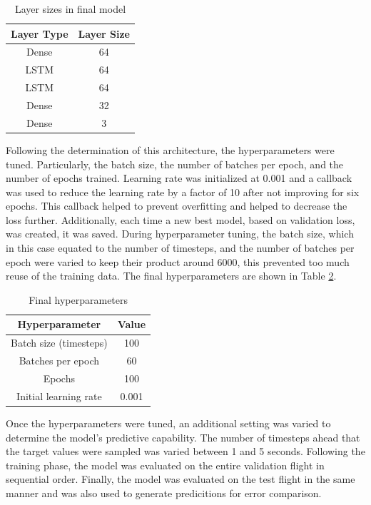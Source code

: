 \documentclass[10pt]{IEEEtran}
\begin{document}
\begin{table}
    \caption{Layer sizes in final model}
    \centering
    \begin{tabular}{cc}
        \hline
        \textbf{Layer Type} & \textbf{Layer Size} \\
        \hline
        Dense & 64\\
        LSTM & 64\\
        LSTM & 64\\
        Dense & 32\\
        Dense & 3\\
        \hline
    \end{tabular}
    \label{t:layer_sizes}
\end{table}

Following the determination of this architecture, the hyperparameters were tuned. Particularly, the batch size, the number of batches per epoch, and the number of epochs trained. Learning rate was initialized at 0.001 and a callback was used to reduce the learning rate by a factor of 10 after not improving for six epochs. This callback helped to prevent overfitting and helped to decrease the loss further. Additionally, each time a new best model, based on validation loss, was created, it was saved. During hyperparameter tuning, the batch size, which in this case equated to the number of timesteps, and the number of batches per epoch were varied to keep their product around 6000, this prevented too much reuse of the training data. The final hyperparameters are shown in Table \ref{t:hyperparams}.

\begin{table}
    \caption{Final hyperparameters}
    \centering
    \begin{tabular}{cc}
        \hline
        \textbf{Hyperparameter} & \textbf{Value}\\
        \hline
        Batch size (timesteps) & 100\\
        Batches per epoch & 60\\
        Epochs & 100\\
        Initial learning rate & 0.001\\
        \hline
    \end{tabular}
    \label{t:hyperparams}
\end{table}

Once the hyperparameters were tuned, an additional setting was varied to determine the model's predictive capability. The number of timesteps ahead that the target values were sampled was varied between 1 and 5 seconds. Following the training phase, the model was evaluated on the entire validation flight in sequential order. Finally, the model was evaluated on the test flight in the same manner and was also used to generate predicitions for error comparison. 
\end{document}
